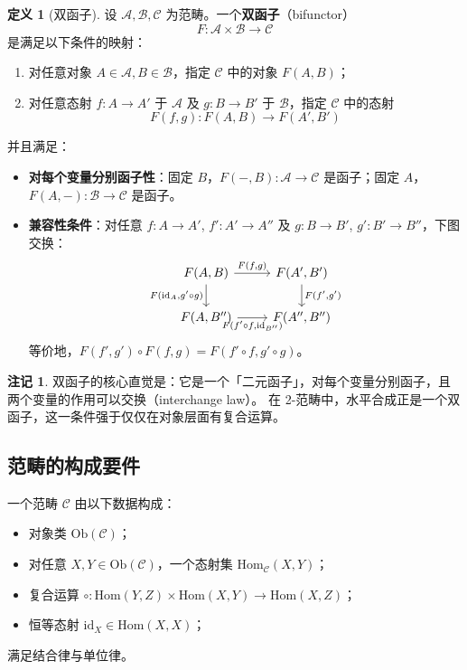 \documentclass[UTF8,a4paper,12pt]{ctexart}
\theoremstyle{definition}
\newtheorem{definition}{定义}[section]
\newtheorem{remark}{注记}[section]
\theoremstyle{plain}
\newcommand{\cat}[1]{\mathcal{#1}}
\newcommand{\Ob}{\mathrm{Ob}}
\newcommand{\Hom}{\mathrm{Hom}}
\newcommand{\id}{\mathrm{id}}
\begin{document}
\begin{definition}[双函子]
设 $\cat{A}, \cat{B}, \cat{C}$ 为范畴。一个\textbf{双函子}（bifunctor）
\[
F : \cat{A} \times \cat{B} \to \cat{C}
\]
是满足以下条件的映射：
\begin{enumerate}
  \item 对任意对象 $A \in \cat{A}, B \in \cat{B}$，指定 $\cat{C}$ 中的对象 $F(A,B)$；
  \item 对任意态射 $f : A \to A'$ 于 $\cat{A}$ 及 $g : B \to B'$ 于 $\cat{B}$，指定 $\cat{C}$ 中的态射
  \[
  F(f,g) : F(A,B) \to F(A',B')
  \]
\end{enumerate}
并且满足：
\begin{itemize}
  \item \textbf{对每个变量分别函子性}：固定 $B$，$F(-,B) : \cat{A} \to \cat{C}$ 是函子；固定 $A$，$F(A,-) : \cat{B} \to \cat{C}$ 是函子。
  \item \textbf{兼容性条件}：对任意 $f : A \to A'$, $f' : A' \to A''$ 及 $g : B \to B'$, $g' : B' \to B''$，下图交换：
  \[
  \begin{tikzcd}
    {F(A,B)} \ar[r,"{F(f,g)}"] \ar[d,"{F(\id_A, g' \circ g)}"'] &
    {F(A',B')} \ar[d,"{F(f', g')}"] \\
    {F(A,B'')} \ar[r,"{F(f' \circ f, \id_{B''})}"'] &
    {F(A'',B'')}
  \end{tikzcd}
  \]
  等价地，$F(f',g') \circ F(f,g) = F(f' \circ f, g' \circ g)$。
\end{itemize}
\end{definition}

\begin{remark}
双函子的核心直觉是：它是一个「二元函子」，对每个变量分别函子，且两个变量的作用可以交换（interchange law）。
在 2-范畴中，水平合成正是一个双函子，这一条件强于仅仅在对象层面有复合运算。
\end{remark}

\subsection{范畴的构成要件}

一个范畴 $\cat{C}$ 由以下数据构成：
\begin{itemize}
  \item 对象类 $\Ob(\cat{C})$；
  \item 对任意 $X,Y \in \Ob(\cat{C})$，一个态射集 $\Hom_{\cat{C}}(X,Y)$；
  \item 复合运算 $\circ : \Hom(Y,Z) \times \Hom(X,Y) \to \Hom(X,Z)$；
  \item 恒等态射 $\id_X \in \Hom(X,X)$；
\end{itemize}
满足结合律与单位律。
\end{document}
